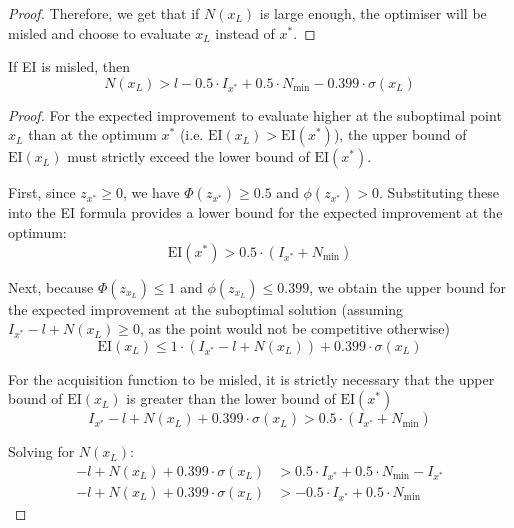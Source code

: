 {\begin{proof}
Therefore, we get that if $N(x_L)$ is large enough, the optimiser will be misled and choose to evaluate $x_L$ instead of $x^*$.
\end{proof}

\begin{theorem}
If EI is misled, then
\begin{equation*}
    N(x_L) > l - 0.5 \cdot I_{x^*} + 0.5 \cdot N_{\min} - 0.399 \cdot \sigma(x_L)
\end{equation*}

\end{theorem}

\begin{proof}
For the expected improvement to evaluate higher at the suboptimal point $x_L$ than at the optimum $x^*$ (i.e. $\mathrm{EI}(x_L) > \mathrm{EI}(x^*)$), the upper bound of $\mathrm{EI}(x_L)$ must strictly exceed the lower bound of $\mathrm{EI}(x^*)$.

First, since $z_{x^*} \ge 0$, we have $\Phi(z_{x^*}) \ge 0.5$ and $\phi(z_{x^*}) > 0$. Substituting these into the EI formula provides a lower bound for the expected improvement at the optimum:
\begin{equation*}
    \mathrm{EI}(x^*) > 0.5 \cdot (I_{x^*} + N_{\min})
\end{equation*}

Next, because $\Phi(z_{x_L}) \le 1$ and $\phi(z_{x_L}) \le 0.399$, we obtain the upper bound for the expected improvement at the suboptimal solution (assuming $I_{x^*} - l + N(x_L) \ge 0$, as the point would not be competitive otherwise)
\begin{equation*}
    \mathrm{EI}(x_L) \le 1 \cdot (I_{x^*} - l + N(x_L)) + 0.399 \cdot \sigma(x_L)
\end{equation*}

For the acquisition function to be misled, it is strictly necessary that the upper bound of $\mathrm{EI}(x_L)$ is greater than the lower bound of $\mathrm{EI}(x^*)$
\begin{equation*}
    I_{x^*} - l + N(x_L) + 0.399 \cdot \sigma(x_L) > 0.5 \cdot (I_{x^*} + N_{\min})
\end{equation*}

Solving for $N(x_L)$:
\begin{align*}
    -l + N(x_L) + 0.399 \cdot \sigma(x_L) &> 0.5 \cdot I_{x^*} + 0.5 \cdot N_{\min} - I_{x^*} \\
    -l + N(x_L) + 0.399 \cdot \sigma(x_L) &> -0.5 \cdot I_{x^*} + 0.5 \cdot N_{\min}
\end{align*}


\end{proof}}
